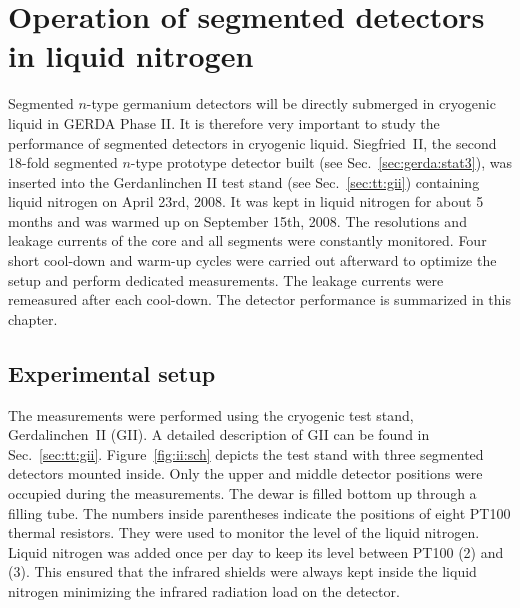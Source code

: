 \chapter[Operation of segmented detectors in LN$_{2}$]{Operation of segmented detectors in liquid nitrogen}
\label{cha:GII}
Segmented $n$-type germanium detectors will be directly submerged in cryogenic liquid in GERDA Phase II. It is therefore very important to study the performance of segmented detectors in cryogenic liquid. Siegfried~II,  the second 18-fold segmented $n$-type prototype detector built (see Sec.~\ref{sec:gerda:stat3}), was inserted into the Gerdanlinchen II test stand (see Sec.~\ref{sec:tt:gii}) containing liquid nitrogen on April 23rd, 2008. It was kept in liquid nitrogen for about 5 months and was warmed up on September 15th, 2008. The resolutions and leakage currents of the core and all segments were constantly monitored. Four short cool-down and warm-up cycles were carried out afterward to optimize the setup and perform dedicated measurements. The leakage currents were remeasured after each cool-down. The detector performance is summarized in this chapter.


\section{Experimental setup}
\label{sec:gii:setup}
The measurements were performed using the cryogenic test stand, Gerdalinchen~II (GII). A detailed description of GII can be found in Sec.~\ref{sec:tt:gii}. Figure~\ref{fig:ii:sch} depicts the test stand with three segmented detectors mounted inside. Only the upper and middle detector positions were occupied during the measurements. The dewar is filled bottom up through a filling tube. The numbers inside parentheses indicate the positions of eight PT100 thermal resistors. They were used to monitor the level of the liquid nitrogen. Liquid nitrogen was added once per day to keep its level between PT100 (2) and (3). This ensured that the infrared shields were always kept inside the liquid nitrogen minimizing the infrared radiation load on the detector. 

